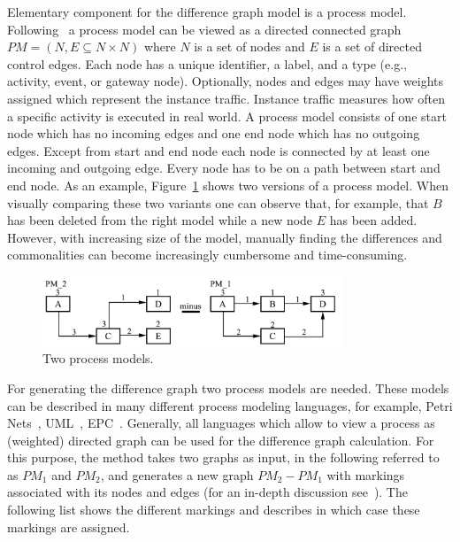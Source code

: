\documentclass{llncs}
\begin{document}
Elementary component for the difference graph model is a process model. Following~\cite{lit:VisuApprDiffAnalysis} a process model can be viewed as a directed connected graph $PM = (N, E \subseteq N \times N)$ where $N$ is a set of nodes and $E$ is a set of directed control edges. Each node has a unique identifier, a label, and a type (e.g., activity, event, or gateway node). Optionally, nodes and edges may have weights assigned which represent the instance traffic. Instance traffic measures how often a specific activity is executed in real world. A process model consists of one start node which has no incoming edges and one end node which has no outgoing edges. Except from start and end node each node is connected by at least one incoming and outgoing edge. Every node has to be on a path between start and end node. As an example, Figure~\ref{fig:ProcessModels} shows two versions of a process model. When visually comparing these two variants one can observe that, for example, that $B$ has been deleted from the right model while a new node $E$ has been added. However, with increasing size of the model, manually finding the differences and commonalities can become increasingly cumbersome and time-consuming.

\begin{figure}
	\centering
	\includegraphics[width=0.8\textwidth]{Images/ProcessModels.PNG}
	\caption{Two process models.}
	\label{fig:ProcessModels}
\end{figure}

For generating the difference graph two process models are needed. These models can be described in many different process modeling languages, for example, Petri Nets~\cite{lit:Petrinet}, UML~\cite{lit:UML}, EPC~\cite{lit:EPC}. Generally, all languages which allow to view a process as (weighted) directed graph can be used for the difference graph calculation. For this purpose, the method takes two graphs as input, in the following referred to as $PM_1$ and $PM_2$, and generates a new graph $PM_2 - PM_1$ with markings associated with its nodes and edges (for an in-depth discussion see~\cite{lit:VisuApprDiffAnalysis}). The following list shows the different markings and describes in which case these markings are assigned.
\end{document}
